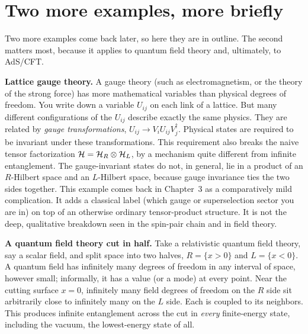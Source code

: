 \section{Two more examples, more briefly}

Two more examples come back later, so here they are in outline. The second matters most, because it applies
to quantum field theory and, ultimately, to AdS/CFT.

\textbf{Lattice gauge theory.} A gauge theory (such as electromagnetism, or the theory of the strong force)
has more mathematical variables than physical degrees of freedom. You write down a variable $U_{ij}$ on each
link of a lattice. But many different configurations of the $U_{ij}$ describe exactly the same physics. They
are related by \emph{gauge transformations}, $U_{ij}\to V_iU_{ij}V_j^\dagger$. Physical states are required to
be invariant under these transformations. This requirement also breaks the naive tensor factorization
$\mathcal{H}=\mathcal{H}_R\otimes\mathcal{H}_L$, by a mechanism quite different from infinite entanglement. The gauge-invariant states
do not, in general, lie in a product of an $R$-Hilbert space and an $L$-Hilbert space, because gauge
invariance ties the two sides together. This example comes back in Chapter~3 as a comparatively mild
complication. It adds a classical label (which gauge or superselection sector you are in) on top of an
otherwise ordinary tensor-product structure. It is not the deep, qualitative breakdown seen in the spin-pair
chain and in field theory.

\textbf{A quantum field theory cut in half.} Take a relativistic quantum field theory, say a scalar field, and
split space into two halves, $R=\{x>0\}$ and $L=\{x<0\}$. A quantum field has infinitely many degrees of
freedom in any interval of space, however small; informally, it has a value (or a mode) at every point. Near
the cutting surface $x=0$, infinitely many field degrees of freedom on the $R$ side sit arbitrarily close to
infinitely many on the $L$ side. Each is coupled to its neighbors. This produces infinite entanglement across
the cut in \emph{every} finite-energy state, including the vacuum, the lowest-energy state of all.

